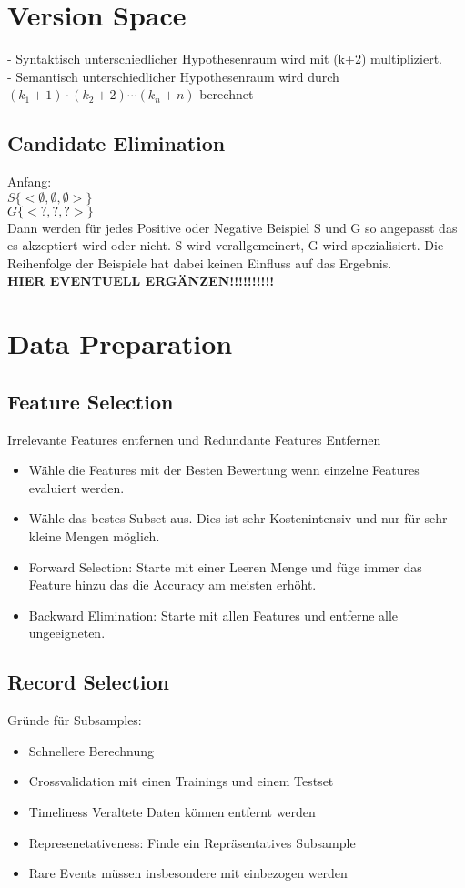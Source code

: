 \documentclass[a4paper]{scrartcl}
\begin{document}
\section{Version Space}
- Syntaktisch unterschiedlicher Hypothesenraum wird mit (k+2) multipliziert.\\
- Semantisch unterschiedlicher Hypothesenraum wird durch $(k_1+1)\cdot(k_2+2)\cdots(k_n+n)$ berechnet\\
\subsection{Candidate Elimination}
Anfang:\\
$S\{<\emptyset, \emptyset, \emptyset>\}$\\
$G\{<?, ?,?>\}$\\
Dann werden für jedes Positive oder Negative Beispiel S und G so angepasst das es akzeptiert wird oder nicht. S wird verallgemeinert, G wird spezialisiert. Die Reihenfolge der Beispiele hat dabei keinen Einfluss auf das Ergebnis.\\

\textbf{HIER EVENTUELL ERGÄNZEN!!!!!!!!!!}

\section{Data Preparation}
\subsection{Feature Selection}
Irrelevante Features entfernen und Redundante Features Entfernen\\
\begin{itemize}
\item Wähle die Features mit der Besten Bewertung wenn einzelne Features evaluiert werden.
\item Wähle das bestes Subset aus. Dies ist sehr Kostenintensiv und nur für sehr kleine Mengen möglich.
\item Forward Selection: Starte mit einer Leeren Menge und füge immer das Feature hinzu das die Accuracy am meisten erhöht.
\item Backward Elimination: Starte mit allen Features und entferne alle ungeeigneten.
\end{itemize}
\subsection{Record Selection}
Gründe für Subsamples:\\
\begin{itemize}
\item Schnellere Berechnung
\item Crossvalidation mit einen Trainings und einem Testset
\item Timeliness Veraltete Daten können entfernt werden
\item Represenetativeness: Finde ein Repräsentatives Subsample
\item Rare Events müssen insbesondere mit einbezogen werden
\end{itemize}
\end{document}
